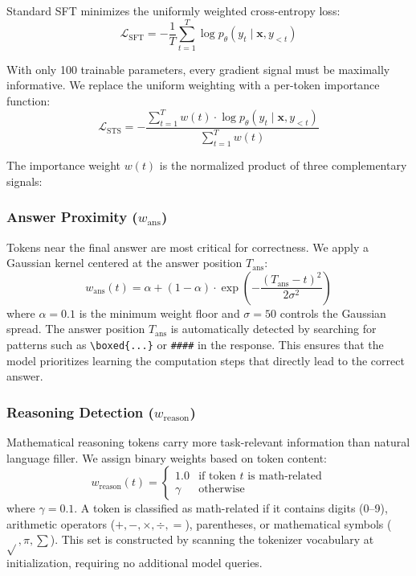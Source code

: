 \documentclass{article}
\begin{document}
Standard SFT minimizes the uniformly weighted cross-entropy loss:
\begin{equation}
  \mathcal{L}_{\text{SFT}} = -\frac{1}{T} \sum_{t=1}^{T} \log p_\theta(y_t \mid \mathbf{x}, y_{<t})
  \label{eq:standard_sft}
\end{equation}

With only 100 trainable parameters, every gradient signal must be maximally informative. We replace the uniform weighting with a per-token importance function:
\begin{equation}
  \mathcal{L}_{\text{STS}} = -\frac{\sum_{t=1}^{T} w(t) \cdot \log p_\theta(y_t \mid \mathbf{x}, y_{<t})}{\sum_{t=1}^{T} w(t)}
  \label{eq:sts_loss}
\end{equation}

The importance weight $w(t)$ is the normalized product of three complementary signals:

\subsubsection{Answer Proximity ($w_{\text{ans}}$)}

Tokens near the final answer are most critical for correctness. We apply a Gaussian kernel centered at the answer position $T_{\text{ans}}$:
\begin{equation}
  w_{\text{ans}}(t) = \alpha + (1 - \alpha) \cdot \exp\!\left(-\frac{(T_{\text{ans}} - t)^2}{2\sigma^2}\right)
  \label{eq:w_ans}
\end{equation}
where $\alpha = 0.1$ is the minimum weight floor and $\sigma = 50$ controls the Gaussian spread. The answer position $T_{\text{ans}}$ is automatically detected by searching for patterns such as \verb|\boxed{...}| or \verb|####| in the response. This ensures that the model prioritizes learning the computation steps that directly lead to the correct answer.

\subsubsection{Reasoning Detection ($w_{\text{reason}}$)}

Mathematical reasoning tokens carry more task-relevant information than natural language filler. We assign binary weights based on token content:
\begin{equation}
  w_{\text{reason}}(t) = \begin{cases}
    1.0 & \text{if token } t \text{ is math-related} \\
    \gamma & \text{otherwise}
  \end{cases}
  \label{eq:w_reason}
\end{equation}
where $\gamma = 0.1$. A token is classified as math-related if it contains digits (0--9), arithmetic operators ($+, -, \times, \div, =$), parentheses, or mathematical symbols ($\sqrt{}, \pi, \sum$). This set is constructed by scanning the tokenizer vocabulary at initialization, requiring no additional model queries.
\end{document}
